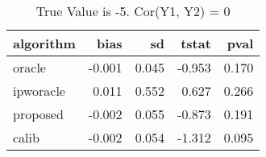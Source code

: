 \begin{table}[h!]

\caption{True Value is -5. Cor(Y1, Y2) = 0}
\centering
\begin{tabular}[t]{lrrrr}
\toprule
algorithm & bias & sd & tstat & pval\\
\midrule
oracle & -0.001 & 0.045 & -0.953 & 0.170\\
ipworacle & 0.011 & 0.552 & 0.627 & 0.266\\
proposed & -0.002 & 0.055 & -0.873 & 0.191\\
calib & -0.002 & 0.054 & -1.312 & 0.095\\
\bottomrule
\end{tabular}
\end{table}
